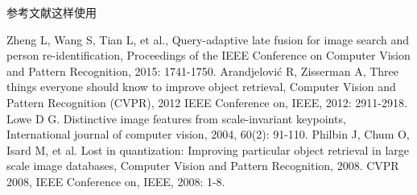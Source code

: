 \documentclass[12pt]{article}
\begin{document}
\clearpage


\clearpage
参考文献这样使用\cite{ref2}
\begin{thebibliography}{99}  
    Zheng L, Wang S, Tian L, et al., Query-adaptive late fusion for image search and person re-identification, Proceedings of the IEEE Conference on Computer Vision and Pattern Recognition, 2015: 1741-1750.  
    Arandjelović R, Zisserman A, Three things everyone should know to improve object retrieval, Computer Vision and Pattern Recognition (CVPR), 2012 IEEE Conference on, IEEE, 2012: 2911-2918.  
    Lowe D G. Distinctive image features from scale-invariant keypoints, International journal of computer vision, 2004, 60(2): 91-110.  
    Philbin J, Chum O, Isard M, et al. Lost in quantization: Improving particular object retrieval in large scale image databases, Computer Vision and Pattern Recognition, 2008. CVPR 2008, IEEE Conference on, IEEE, 2008: 1-8.  
\end{thebibliography}
\end{document}
